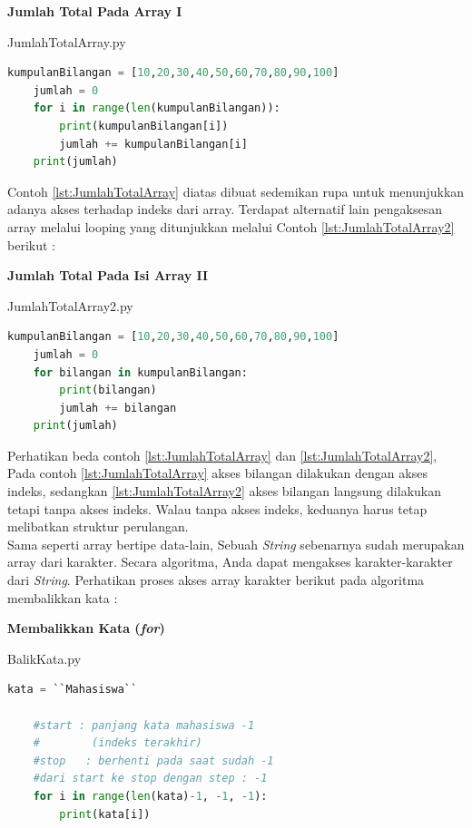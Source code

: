  \begin{contoh}
	\textbf{ Jumlah Total Pada Array I}
\begin{listprog}{JumlahTotalArray.py}
\label{lst:JumlahTotalArray}
\begin{lstlisting}[language=Python]
	kumpulanBilangan = [10,20,30,40,50,60,70,80,90,100]
	jumlah = 0
	for i in range(len(kumpulanBilangan)):
		print(kumpulanBilangan[i])
		jumlah += kumpulanBilangan[i]
	print(jumlah)	
\end{lstlisting}
\end{listprog}
\end{contoh}

Contoh \ref{lst:JumlahTotalArray} diatas dibuat sedemikan rupa untuk menunjukkan adanya akses terhadap indeks dari array. Terdapat alternatif lain pengaksesan array melalui looping yang ditunjukkan melalui Contoh \ref{lst:JumlahTotalArray2} berikut : 

 \begin{contoh}
	\textbf{Jumlah Total Pada Isi Array II}
\begin{listprog}{JumlahTotalArray2.py}
\label{lst:JumlahTotalArray2}
\begin{lstlisting}[language=Python]
	kumpulanBilangan = [10,20,30,40,50,60,70,80,90,100]
	jumlah = 0
	for bilangan in kumpulanBilangan:
		print(bilangan)
		jumlah += bilangan
	print(jumlah)	
\end{lstlisting}
\end{listprog}
\end{contoh}

Perhatikan beda contoh \ref{lst:JumlahTotalArray} dan \ref{lst:JumlahTotalArray2}, Pada contoh \ref{lst:JumlahTotalArray} akses bilangan dilakukan dengan akses indeks, sedangkan \ref{lst:JumlahTotalArray2} akses bilangan langsung dilakukan tetapi tanpa akses indeks. Walau tanpa akses indeks, keduanya harus tetap melibatkan struktur perulangan.\\
Sama seperti array bertipe data-lain, Sebuah \textit{String} sebenarnya sudah merupakan array dari karakter. Secara algoritma, Anda dapat mengakses karakter-karakter dari \textit{String}. Perhatikan proses akses array karakter berikut pada algoritma membalikkan kata : 

\begin{contoh}
	\textbf{Membalikkan Kata (\textit{for})}
\begin{listprog}{BalikKata.py}
\label{lst:BalikKata}
\begin{lstlisting}[language=Python]
	kata = ``Mahasiswa``
	
	#start : panjang kata mahasiswa -1 
	#        (indeks terakhir)
	#stop	: berhenti pada saat sudah -1
	#dari start ke stop dengan step : -1
	for i in range(len(kata)-1, -1, -1):
		print(kata[i])
\end{lstlisting}
\end{listprog}
\end{contoh}

